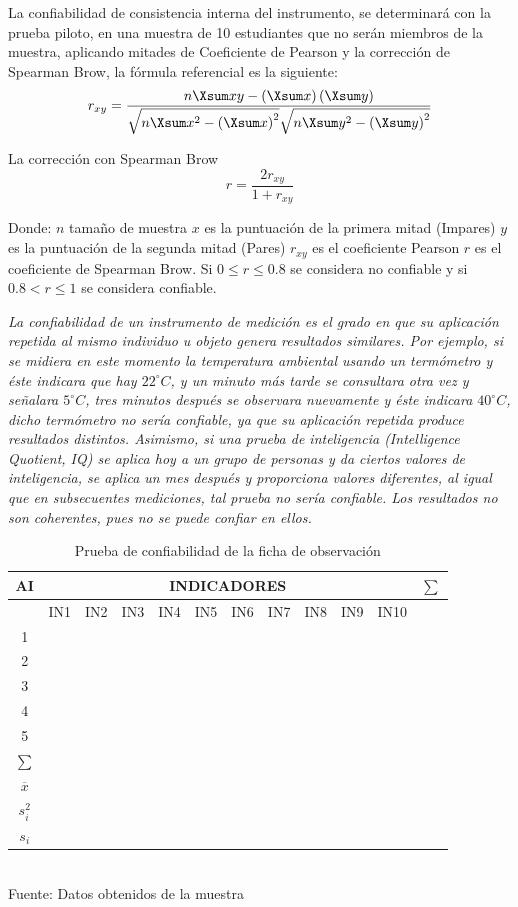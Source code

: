 \documentclass[12pt,a4paper]{article}
\begin{document}
La confiabilidad de consistencia interna del instrumento, se determinará con la prueba piloto, en una muestra de 10 estudiantes que no serán miembros de la muestra, aplicando mitades de Coeficiente de Pearson y la corrección de Spearman Brow, la fórmula referencial es la siguiente: $$r_{xy}=\frac{n\Xsum xy-\cc{\Xsum x}\cc{\Xsum y}}{\sqrt{n\Xsum x^2-\cc{\Xsum x}^2}\sqrt{n\Xsum y^2-\cc{\Xsum y}^2}}$$

La corrección con Spearman Brow $$r=\frac{2r_{xy}}{1+r_{xy}}$$

	Donde:
$n$ tamaño de muestra
$x$ es la puntuación de la primera mitad (Impares)
$y$ es la puntuación de la segunda mitad (Pares)
$r_{xy}$ es el coeficiente Pearson
$r$ es el coeficiente de Spearman Brow. Si $0\leq r\leq 0.8$ se considera no confiable y si $0.8< r \leq1$ se considera confiable.

\begin{displayquote}
\emph{La confiabilidad de un instrumento de medición es el grado en que su aplicación
repetida al mismo individuo u objeto genera resultados similares. Por ejemplo, si se midiera en este momento la temperatura ambiental usando un termómetro y éste indicara que hay $22^\circ C$, y un minuto más tarde se consultara otra vez y señalara $5^\circ C$, tres minutos después se observara nuevamente y éste indicara $40^\circ C$, dicho termómetro no sería confiable, ya que su aplicación repetida produce resultados distintos. Asimismo, si una prueba de inteligencia (Intelligence Quotient, IQ) se aplica hoy a un grupo de personas y da ciertos valores de inteligencia, se aplica un mes después y proporciona valores diferentes, al igual que en subsecuentes mediciones, tal prueba no sería confiable. Los resultados no son coherentes, pues no se puede confiar en ellos.
} \cite[p.~61]{inv1}\end{displayquote}

\begin{table}[ht!]
{%
\caption{Prueba de confiabilidad de la ficha de observación}\label{pret:1}
\begin{tabular}{cccccccccccc}\Xhline{2pt}
AI&\multicolumn{10}{c}{INDICADORES}&$\sum$\\\midrule
&IN1&IN2&IN3&IN4&IN5&IN6&IN7&IN8&IN9&IN10&\\\cline{2-11}
1 &&&&&&&&&&&\\
2 &&&&&&&&&&&\\
3 &&&&&&&&&&&\\
4 &&&&&&&&&&&\\
5 &&&&&&&&&&&\\\midrule
$\sum$         &&&&&&&&&&&\\
$\overline{x}$ &&&&&&&&&&&\\
$s_i^2$        &&&&&&&&&&&\\
$s_i$          &&&&&&&&&&&\\\bottomrule
\end{tabular}\\\vspace{0.5cm}
{\normalsize Fuente: Datos obtenidos de la muestra}
}
\end{table}
\end{document}
